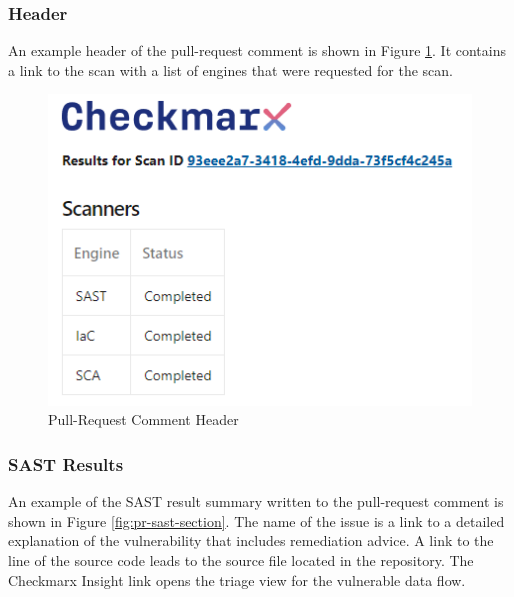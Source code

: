 \subsubsection{Header}

An example header of the pull-request comment is shown in Figure
\ref{fig:pr-header-section}.  It contains a link to the scan with a list of engines
that were requested for the scan.


\begin{figure}[ht]
    \includegraphics[width=\textwidth]{graphics/pr-header.png}
    \caption{Pull-Request Comment Header}
    \label{fig:pr-header-section}
\end{figure}


\subsubsection{SAST Results}

An example of the SAST result summary written to the pull-request comment
is shown in Figure
\ref{fig:pr-sast-section}.  The name of the issue is a link to a detailed
explanation of the vulnerability that includes remediation advice.  A
link to the line of the source code leads to the source file located in the
repository.  The Checkmarx Insight link opens the triage view for the vulnerable
data flow.

